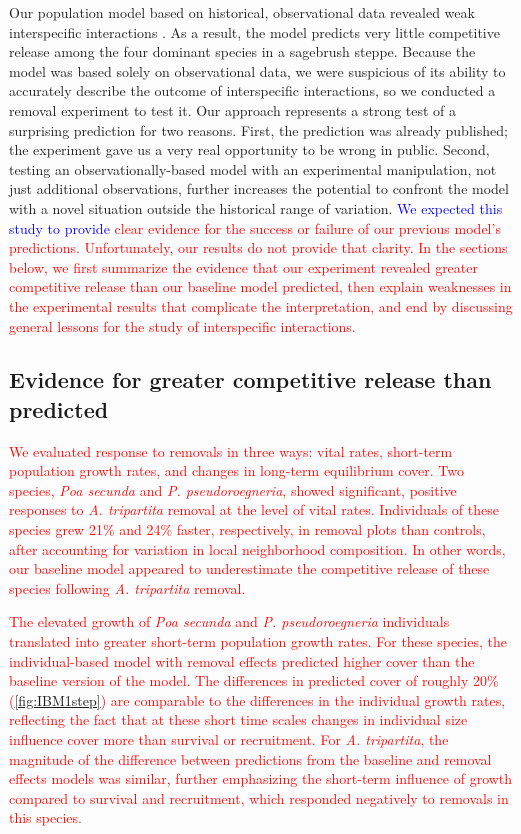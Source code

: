 \documentclass[11pt]{article}
\newcommand{\new}{\textcolor{red}}
\newcommand{\spe}{\textcolor{blue}}
\begin{document}
\begin{doublespacing}
Our population model based on historical, observational data revealed weak interspecific interactions \citep{adler_coexistence_2010,chu_large_2015}. As a result, the model predicts very little competitive release among the four dominant species in a sagebrush steppe. 
Because the model was based solely on observational
data, we were suspicious of its ability to accurately describe the outcome of interspecific interactions, so we conducted a removal experiment to test it. 
Our approach represents a strong test of a surprising prediction for two reasons. First, the prediction was already published; the experiment 
gave us a very real opportunity to be wrong in public. Second, testing an observationally-based model with an experimental manipulation, 
not just additional observations, further increases the potential to confront the model with a novel situation outside the historical range of variation.
\spe{We expected this study to provide} \new{clear evidence for the success or failure of our previous model's predictions. Unfortunately, our results do not provide that clarity. In the sections below, we first summarize the evidence that our experiment revealed greater competitive release than our baseline model predicted, then explain weaknesses in the experimental results that complicate the interpretation, and end by discussing general lessons for the study of interspecific interactions.}

\subsection*{Evidence for greater competitive release than predicted}

\new{We evaluated response to removals in three ways: vital rates, short-term population growth rates, and changes in long-term equilibrium cover. Two species, \textit{Poa secunda} and \textit{P. pseudoroegneria}, showed significant, positive responses to \textit{A. tripartita} removal at the level of vital rates. Individuals of these species grew 21\% and 24\% faster, respectively, in removal plots than controls, after accounting for variation in local neighborhood composition. In other words, our baseline model appeared to underestimate the competitive release of these species following \textit{A. tripartita} removal.}

\new{The elevated growth of \textit{Poa secunda} and \textit{P. pseudoroegneria} individuals translated into greater short-term population growth rates. For these species, the individual-based model with removal effects predicted higher cover than the baseline version of the model. The differences in predicted cover of roughly 20\% (\ref{fig:IBM1step}) are comparable to the differences in the individual growth rates, reflecting the fact that at these short time scales changes in individual size influence cover more than survival or recruitment.  For \textit{A. tripartita}, the magnitude of the difference between predictions from the baseline and removal effects models was similar, further emphasizing the short-term influence of growth compared to survival and recruitment, which responded negatively to removals in this species.   }


\end{doublespacing}
\end{document}
